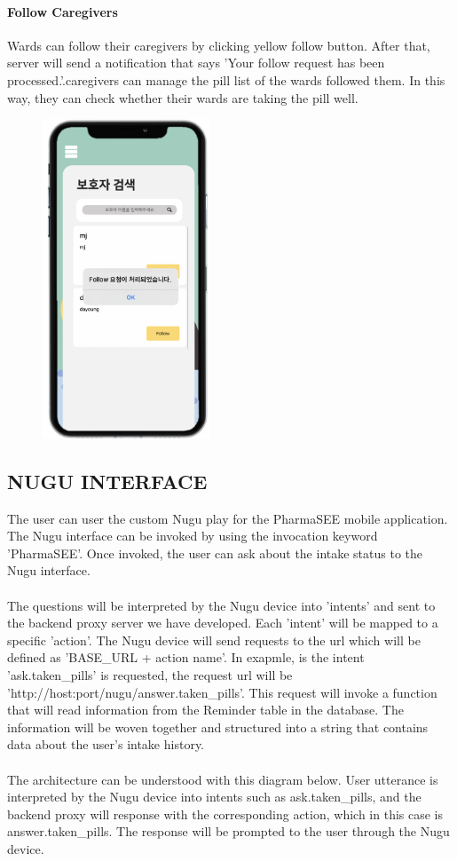 \documentclass[conference]{IEEEtran}
\begin{document}
\paragraph{Follow Caregivers}
Wards can follow their caregivers by clicking yellow follow button. After that, server will send a notification that says 'Your follow request has been processed.'.caregivers can manage the pill list of the wards followed them. In this way, they can check whether their wards are taking the pill well.\\

\begin{figure}[h!]
\centering
\includegraphics[width=5cm]{final_image_folder/bohoja_follow.png}
\caption{}
\label{fig:map}
\end{figure}

\subsection{NUGU INTERFACE}
The user can user the custom Nugu play for the PharmaSEE mobile application. The Nugu interface can be invoked by using the invocation keyword 'PharmaSEE'. Once invoked, the user can ask about the intake status to the Nugu interface. \\ \\
The questions will be interpreted by the Nugu device into 'intents' and sent to the backend proxy server we have developed. Each 'intent' will be mapped to a specific 'action'. The Nugu device will send requests to the url which will be defined as 'BASE\_URL + action name'. In exapmle, is the intent 'ask.taken\_pills' is requested, the request url will be 'http://host:port/nugu/answer.taken\_pills'. This request will invoke a function that will read information from the Reminder table in the database. The information will be woven together and structured into a string that contains data about the user's intake history. \\ \\
The architecture can be understood with this diagram below. User utterance is interpreted by the Nugu device into intents such as ask.taken\_pills, and the backend proxy will response with the corresponding action, which in this case is answer.taken\_pills. The response will be prompted to the user through the Nugu device.
\end{document}
